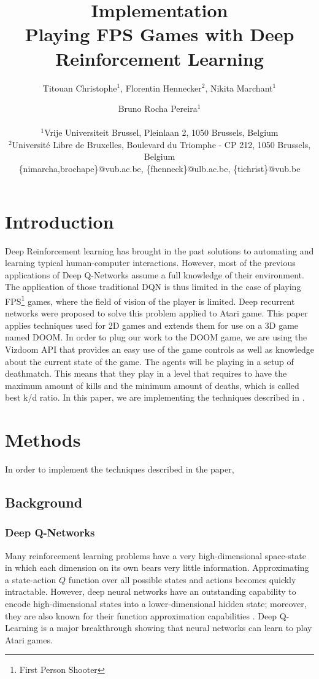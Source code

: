 \documentclass[letterpaper]{article}
\title{Implementation\\Playing FPS Games with Deep Reinforcement Learning}
\author{Titouan Christophe$^{1}$, Florentin Hennecker$^{2}$, Nikita Marchant$^{1}$ \and Bruno Rocha Pereira$^{1}$ \\
\mbox{}\\
$^1$Vrije Universiteit Brussel, Pleinlaan 2, 1050 Brussels, Belgium \\
$^2$Universit\'e Libre de Bruxelles, Boulevard du Triomphe - CP 212, 1050
Brussels, Belgium \\
\{nimarcha,brochape\}@vub.ac.be, \{fhenneck\}@ulb.ac.be, \{tichrist\}@vub.be}
\begin{document}
\maketitle

\begin{abstract}
\end{abstract}

\section{Introduction}
Deep Reinforcement learning has brought in the past solutions to automating and
learning typical human-computer interactions. 
However, most of the previous applications of Deep Q-Networks assume a full
knowledge of their environment. The application of those traditional DQN is 
thus limited in the case of playing FPS\footnote{First Person Shooter} games,
where the field of vision of the player is limited. Deep recurrent networks 
were proposed to solve this problem \citep{Hausknecht2015} applied to Atari 
game. This paper applies techniques used for 2D games and extends them for use
on a 3D game named DOOM.
In order to plug our work to the DOOM game, we are using the Vizdoom API 
\citep{Kempka2016} that provides an easy use of the game controls as well as
knowledge about the current state of the game.
The agents will be playing in a setup of deathmatch. This means that they play
in a level that requires to have the maximum amount of kills and the minimum
amount of deaths, which is called best k/d ratio.
In this paper, we are implementing the techniques described in
\citep{Lample2016}.

\section{Methods}
In order to implement the techniques described in the paper,

\subsection{Background}
\subsubsection{Deep Q-Networks}
Many reinforcement learning problems have a very high-dimensional space-state
in which each dimension on its own bears very little information. Approximating
a state-action $Q$ function over all possible states and actions becomes quickly
intractable. However, deep neural networks have an outstanding capability to
encode high-dimensional states into a lower-dimensional hidden state; moreover,
they are also known for their function approximation capabilities
\citep{Hornik1991}. Deep Q-Learning \citep{Mnih2015} is a major breakthrough
showing that neural networks can learn to play Atari games.
\end{document}
